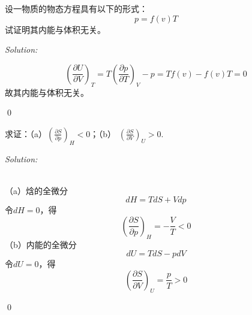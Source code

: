 \documentclass[12pt,a4paper]{article}
\newenvironment{problem}[2][Problem]{\begin{trivlist}
\item[\hskip \labelsep {\bfseries #1}\hskip \labelsep {\bfseries #2.}]}{\end{trivlist}}
\newenvironment{sol}
    {\emph{Solution:}
    }
    {
    \qed
    }
\begin{document}
\begin{problem}{2.2}
设一物质的物态方程具有以下的形式：
\[
p=f(v)T
\]
试证明其内能与体积无关。
\end{problem}
\begin{sol}
\begin{equation}
\left(\frac{\partial U}{\partial V}\right)_T=T\left(\frac{\partial p}{\partial T}\right)_V-p=Tf(v)-f(v)T=0
\end{equation}
故其内能与体积无关。
\end{sol}

\begin{problem}{2.3}
求证：（a）$\left(\frac{\partial S}{\partial p}\right)_H<0$；（b） $\left(\frac{\partial S}{\partial V}\right)_U>0$.
\end{problem}
\begin{sol}
\\（a）焓的全微分
\begin{equation}
dH=TdS+Vdp
\end{equation}
令$dH=0$，得
\begin{equation}
\left(\frac{\partial S}{\partial p}\right)_H=-\frac{V}{T}<0
\end{equation}
（b）内能的全微分
\begin{equation}
dU=TdS-pdV
\end{equation}
令$dU=0$，得
\begin{equation}
\left(\frac{\partial S}{\partial V}\right)_U=\frac{p}{T}>0
\end{equation}
\end{sol}
\end{document}
